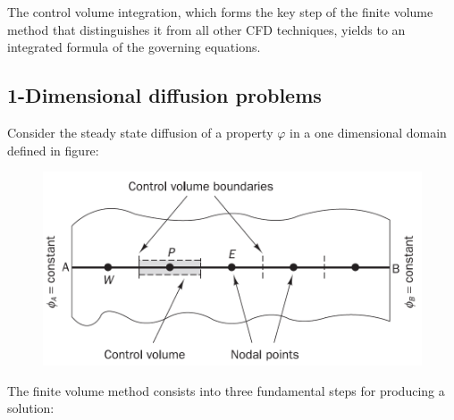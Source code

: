 \documentclass[a4paper, 15pt]{article}
\begin{document}
	The
	control volume integration, which forms the key step of the finite volume method that
	distinguishes it from all other CFD techniques, yields to an integrated formula of the governing equations.  

\subsection{1-Dimensional diffusion problems}

	Consider
	the steady state diffusion of a property $\varphi$ in a one dimensional domain defined in
	figure:
	\begin{figure}[H]
		\centering
		\includegraphics[width=0.5\linewidth]{fig/screenshot006}
		\label{fig:screenshot006}
	\end{figure}
	The finite volume method consists into three fundamental steps for producing a solution:
\end{document}
